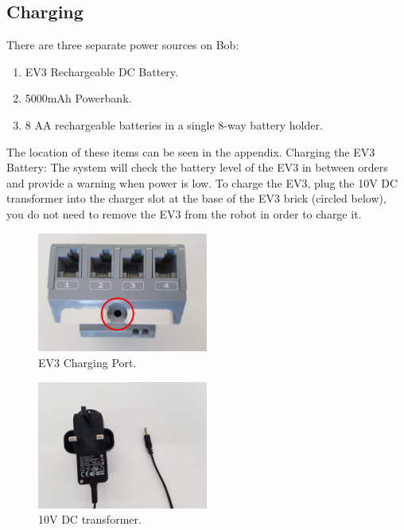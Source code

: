 \documentclass[onecolumn]{IEEEtran}
\begin{document}
\subsection{Charging}
There are three separate power sources on Bob:
\begin{enumerate}
    \item EV3 Rechargeable DC Battery.
    \item 5000mAh Powerbank.
    \item 8 AA rechargeable batteries in a single 8-way battery holder.
\end{enumerate}
The location of these items can be seen in the appendix.
\newline
Charging the EV3 Battery:
\newline
The system will check the battery level of the EV3 in between orders and provide a warning when power is low. 
\newline
To charge the EV3, plug the 10V DC transformer into the charger slot at the base of the EV3 brick (circled below), you do not need to remove the EV3 from the robot in order to charge it.  
\begin{figure}[H]
    \begin{center}
    \includegraphics[width=0.5\textwidth]{ev3-charge.png}
    \caption{EV3 Charging Port.}
    \label{fig: figure}
    \end{center}
\end{figure}
\begin{figure}[H]
    \begin{center}
    \includegraphics[width=0.5\textwidth]{ev3-adapter.jpg}
    \caption{10V DC transformer.}
    \label{fig: figure}
    \end{center}
\end{figure}
\end{document}
